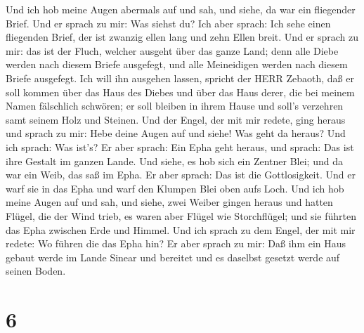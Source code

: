 Und ich hob meine Augen abermals auf und sah, und siehe, da
war ein fliegender Brief.  Und er sprach zu mir: Was siehst
du? Ich aber sprach: Ich sehe einen fliegenden Brief, der ist zwanzig
ellen lang und zehn Ellen breit.  Und er sprach zu mir: das
ist der Fluch, welcher ausgeht über das ganze Land; denn alle Diebe
werden nach diesem Briefe ausgefegt, und alle Meineidigen werden nach
diesem Briefe ausgefegt.  Ich will ihn ausgehen lassen,
spricht der HERR Zebaoth, daß er soll kommen über das Haus des Diebes
und über das Haus derer, die bei meinem Namen fälschlich schwören; er
soll bleiben in ihrem Hause und soll's verzehren samt seinem Holz und
Steinen.  Und der Engel, der mit mir redete, ging heraus und
sprach zu mir: Hebe deine Augen auf und siehe! Was geht da heraus?
 Und ich sprach: Was ist's? Er aber sprach: Ein Epha geht
heraus, und sprach: Das ist ihre Gestalt im ganzen Lande. 
Und siehe, es hob sich ein Zentner Blei; und da war ein Weib, das saß im
Epha.  Er aber sprach: Das ist die Gottlosigkeit. Und er
warf sie in das Epha und warf den Klumpen Blei oben aufs Loch.
 Und ich hob meine Augen auf und sah, und siehe, zwei Weiber
gingen heraus und hatten Flügel, die der Wind trieb, es waren aber
Flügel wie Storchflügel; und sie führten das Epha zwischen Erde und
Himmel.  Und ich sprach zu dem Engel, der mit mir redete:
Wo führen die das Epha hin?  Er aber sprach zu mir: Daß ihm
ein Haus gebaut werde im Lande Sinear und bereitet und es daselbst
gesetzt werde auf seinen Boden.

\hypertarget{section-5}{%
\section{6}\label{section-5}}

